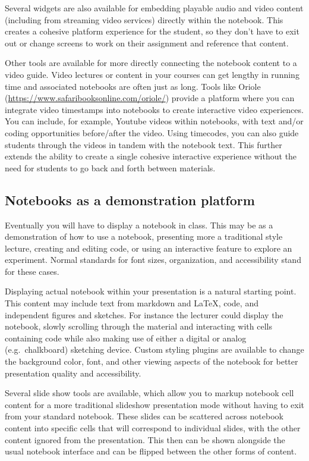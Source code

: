 \documentclass[]{book}
\begin{document}
Several widgets are also available for embedding playable audio and
video content (including from streaming video services) directly within
the notebook. This creates a cohesive platform experience for the
student, so they don't have to exit out or change screens to work on
their assignment and reference that content.

Other tools are available for more directly connecting the notebook
content to a video guide. Video lectures or content in your courses can
get lengthy in running time and associated notebooks are often just as
long. Tools like Oriole
(\url{https://www.safaribooksonline.com/oriole/}) provide a platform
where you can integrate video timestamps into notebooks to create
interactive video experiences. You can include, for example, Youtube
videos within notebooks, with text and/or coding opportunities
before/after the video. Using timecodes, you can also guide students
through the videos in tandem with the notebook text. This further
extends the ability to create a single cohesive interactive experience
without the need for students to go back and forth between materials.

\subsection{Notebooks as a demonstration
platform}\label{notebooks-as-a-demonstration-platform}

Eventually you will have to display a notebook in class. This may be as
a demonstration of how to use a notebook, presenting more a traditional
style lecture, creating and editing code, or using an interactive
feature to explore an experiment. Normal standards for font sizes,
organization, and accessibility stand for these cases.

Displaying actual notebook within your presentation is a natural
starting point. This content may include text from markdown and LaTeX,
code, and independent figures and sketches. For instance the lecturer
could display the notebook, slowly scrolling through the material and
interacting with cells containing code while also making use of either a
digital or analog (e.g.~chalkboard) sketching device. Custom styling
plugins are available to change the background color, font, and other
viewing aspects of the notebook for better presentation quality and
accessibility.

Several slide show tools are available, which allow you to markup
notebook cell content for a more traditional slideshow presentation mode
without having to exit from your standard notebook. These slides can be
scattered across notebook content into specific cells that will
correspond to individual slides, with the other content ignored from the
presentation. This then can be shown alongside the usual notebook
interface and can be flipped between the other forms of content.
\end{document}
